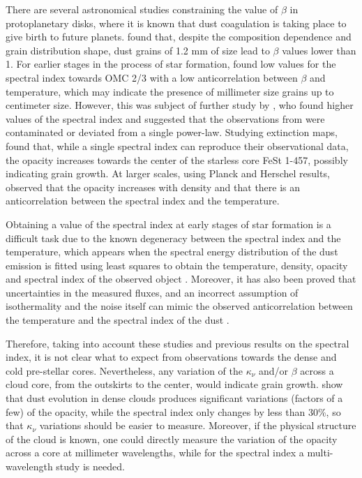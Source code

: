 \documentclass{aa}
\begin{document}
There are several astronomical studies constraining the value of $\beta$ in protoplanetary disks, where it is known that dust coagulation is taking place to give birth to future planets.  found that, despite the composition dependence and grain distribution shape, dust grains of 1.2 mm of size lead to $\beta$ values lower than 1. For earlier stages in the process of star formation,   found low values for the spectral index towards OMC 2/3 with a low anticorrelation between $\beta$ and temperature, which may indicate the presence of millimeter size grains up to centimeter size. However, this was subject of further study by , who found higher values of the spectral index and suggested that the observations from  were contaminated or deviated from a single power-law. Studying extinction maps,  found that, while a single spectral index can reproduce their observational data, the opacity increases towards the center of the starless core FeSt 1-457, possibly indicating grain growth. At larger scales, using Planck and Herschel results,  observed that the opacity increases with density and that there is an anticorrelation between the spectral index and the temperature. 

Obtaining a value of the spectral index at early stages of star formation is a difficult task due to the known degeneracy between the spectral index and the temperature, which appears when the spectral energy distribution of the dust emission is fitted using least squares to obtain the temperature, density, opacity and spectral index of the observed object . Moreover, it has also been proved that uncertainties in the measured fluxes, and  an incorrect assumption of isothermality and the noise itself can mimic the observed anticorrelation between the temperature and the spectral index of the dust . 

Therefore, taking into account these studies and previous results on the spectral index, it is not clear what to expect from observations towards the dense and cold pre-stellar cores. Nevertheless, any variation of the $\kappa_{\nu}$ and/or $\beta$ across a cloud core, from the outskirts to the center, would indicate grain growth.  show that dust evolution in dense clouds produces significant variations (factors of a few) of the opacity, while the spectral index only changes by less than 30\%, so that $\kappa_{\nu}$ variations should be easier to measure. Moreover, if the physical structure of the cloud is known, one could directly measure the variation of the opacity across a core at millimeter wavelengths, while for the spectral index a multi-wavelength study is needed. 
\end{document}
